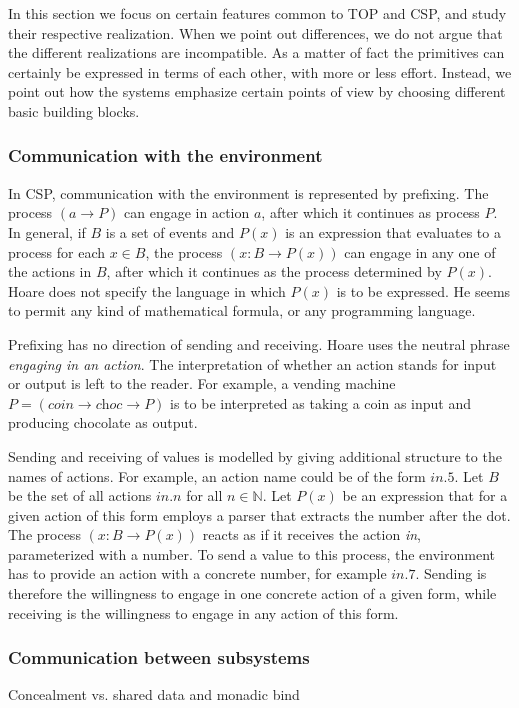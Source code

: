 In this section we focus on certain features common to TOP and CSP, and study their respective realization.
When we point out differences, we do not argue that the different realizations are incompatible.
As a matter of fact the primitives can certainly be expressed in terms of each other, with more or less effort.
Instead, we point out how the systems emphasize certain points of view by choosing different basic building blocks.

\subsubsection*{Communication with the environment}

In CSP, communication with the environment is represented by prefixing.
The process $(a \to P)$ can engage in action $a$, after which it continues as process $P$.
In general, if $B$ is a set of events and $P(x)$ is an expression that evaluates to a process for each $x \in B$, the process $(x:B \to P(x))$ can engage in any one of the actions in $B$, after which it continues as the process determined by $P(x)$.
Hoare does not specify the language in which $P(x)$ is to be expressed.
He seems to permit any kind of mathematical formula, or any programming language.

Prefixing has no direction of sending and receiving.
Hoare uses the neutral phrase \emph{engaging in an action}.
The interpretation of whether an action stands for input or output is left to the reader.
For example, a vending machine $P = (\textit{coin} \to \textit{choc} \to P)$ is to be interpreted as taking a coin as input and producing chocolate as output.

Sending and receiving of values is modelled by giving additional structure to the names of actions.
For example, an action name could be of the form $\textit{in}.5$.
Let $B$ be the set of all actions $\textit{in}.n$ for all $n \in \mathbb{N}$.
Let $P(x)$ be an expression that for a given action of this form employs a parser that extracts the number after the dot.
The process $(x:B \to P(x))$ reacts as if it receives the action \textit{in}, parameterized with a number.
To send a value to this process, the environment has to provide an action with a concrete number, for example $\textit{in}.7$.
Sending is therefore the willingness to engage in one concrete action of a given form, while receiving is the willingness to engage in any action of this form.


\subsubsection*{Communication between subsystems}
Concealment vs. shared data and monadic bind


